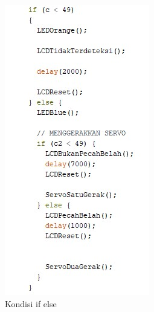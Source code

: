 \begin{figure}[!htbp]
\centering
\includegraphics[width=.75\textwidth]{figures/CONV/prs1.jpg}
\caption{Kondisi if else}\label{fig:prs1}
\end{figure}